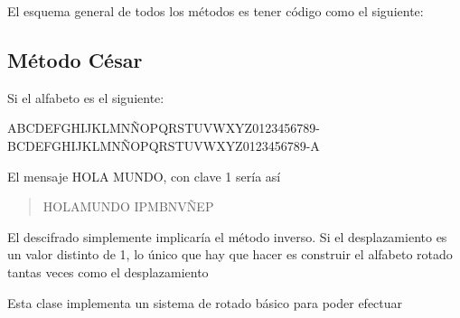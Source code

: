 \documentclass[letterpaper,10pt,spanish]{sphinxmanual}
\begin{document}
El esquema general de todos los métodos es tener código como el siguiente:

%
\begin{sphinxVerbatim}[commandchars=\\\{\}]
      

    
\end{sphinxVerbatim}


\subsection{Método César}
\label{\detokenize{textos/tema5:metodo-cesar}}
Si el alfabeto es el siguiente:

ABCDEFGHIJKLMNÑOPQRSTUVWXYZ0123456789-
BCDEFGHIJKLMNÑOPQRSTUVWXYZ0123456789-A

El mensaje HOLA MUNDO, con clave 1 sería así
\begin{quote}

HOLAMUNDO
IPMBNVÑEP
\end{quote}

El descifrado simplemente implicaría el método inverso. Si el desplazamiento es un valor distinto de 1, lo único que hay que hacer es construir el alfabeto rotado tantas veces como el desplazamiento

Esta clase implementa un sistema de rotado básico para poder efectuar
\end{document}
